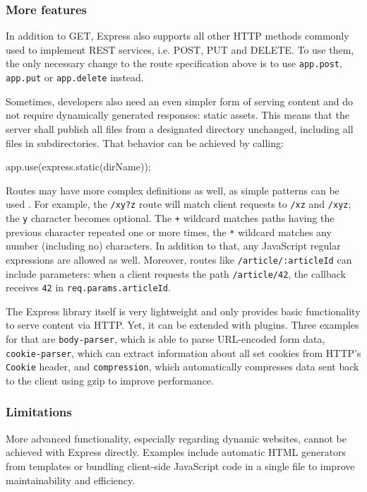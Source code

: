 \documentclass{bioinfo}
\begin{document}
\subsubsection{More features}

In addition to GET, Express also supports all other HTTP methods commonly used to implement REST services, i.e. POST, PUT and DELETE. To use them, the only necessary change to the route specification above is to use \texttt{app.post}, \texttt{app.put} or \texttt{app.delete} instead.

Sometimes, developers also need an even simpler form of serving content and do not require dynamically generated responses: static assets. This means that the server shall publish all files from a designated directory unchanged, including all files in subdirectories. That behavior can be achieved by calling:

\begin{verbatim*}
    app.use(express.static(dirName));
\end{verbatim*}

Routes may have more complex definitions as well, as simple patterns can be used \cite{expressrouting}. For example, the \texttt{/xy?z} route will match client requests to \texttt{/xz} and \texttt{/xyz}; the \texttt{y} character becomes optional. The \texttt{+} wildcard matches paths having the previous character repeated one or more times, the \texttt{*} wildcard matches any number (including no) characters. In addition to that, any JavaScript regular expressions are allowed as well. Moreover, routes like \texttt{/article/:articleId} can include parameters: when a client requests the path \texttt{/article/42}, the callback receives \texttt{42} in \texttt{req.params.articleId}.

The Express library itself is very lightweight and only provides basic functionality to serve content via HTTP. Yet, it can be extended with plugins. Three examples for that are \texttt{body-parser}, which is able to parse URL-encoded form data, \texttt{cookie-parser}, which can extract information about all set cookies from HTTP's \texttt{Cookie} header, and \texttt{compression}, which automatically compresses data sent back to the client using gzip to improve performance.

\subsubsection{Limitations}

More advanced functionality, especially regarding dynamic websites, cannot be achieved with Express directly. Examples include automatic HTML generators from templates or bundling client-side JavaScript code in a single file to improve maintainability and efficiency.
\end{document}

